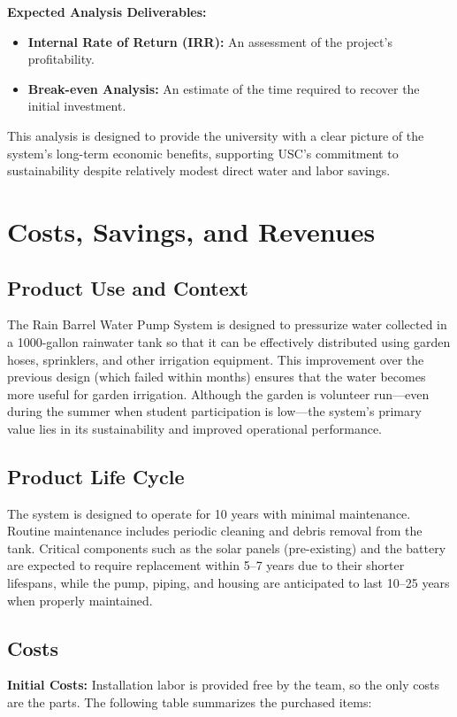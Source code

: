\documentclass[12pt]{report}
\begin{document}
\textbf{Expected Analysis Deliverables:}
\begin{itemize}
    \item \textbf{Internal Rate of Return (IRR):} An assessment of the project’s profitability.
    \item \textbf{Break-even Analysis:} An estimate of the time required to recover the initial investment.
\end{itemize}

This analysis is designed to provide the university with a clear picture of the system’s long-term economic benefits, supporting USC’s commitment to sustainability despite relatively modest direct water and labor savings.

\newpage
\section{Costs, Savings, and Revenues}
\vspace{-0.5em}
\subsection{Product Use and Context}
The Rain Barrel Water Pump System is designed to pressurize water collected in a 1000-gallon rainwater tank so that it can be effectively distributed using garden hoses, sprinklers, and other irrigation equipment. This improvement over the previous design (which failed within months) ensures that the water becomes more useful for garden irrigation. Although the garden is volunteer run—even during the summer when student participation is low—the system’s primary value lies in its sustainability and improved operational performance.

\subsection{Product Life Cycle}
The system is designed to operate for 10 years with minimal maintenance. Routine maintenance includes periodic cleaning and debris removal from the tank. Critical components such as the solar panels (pre-existing) and the battery are expected to require replacement within 5--7 years due to their shorter lifespans, while the pump, piping, and housing are anticipated to last 10--25 years when properly maintained.

\subsection{Costs}
\textbf{Initial Costs:}  
Installation labor is provided free by the team, so the only costs are the parts. The following table summarizes the purchased items:
\end{document}
